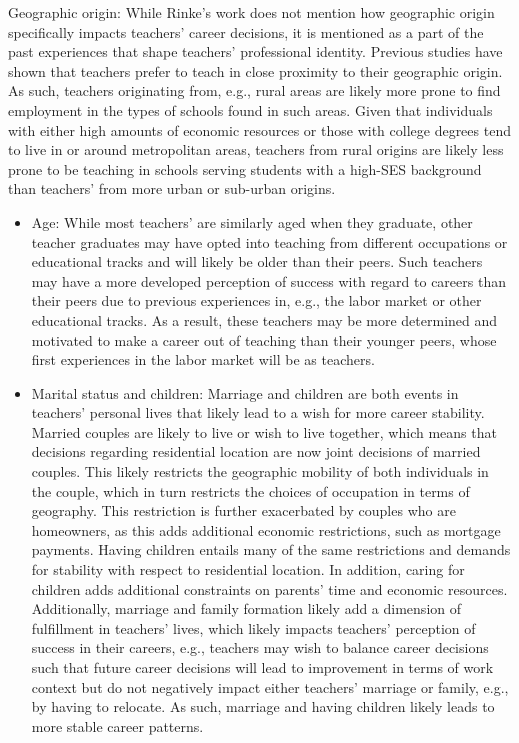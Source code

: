 \documentclass[
]{article}
\providecommand{\tightlist}{%
  \setlength{\itemsep}{0pt}\setlength{\parskip}{0pt}}
\begin{document}
\begin{itemize}
\begin{itemize}
    Geographic origin: While Rinke's work does not mention how geographic origin specifically impacts teachers' career decisions, it is mentioned as a part of the past experiences that shape teachers' professional identity. Previous studies have shown that teachers prefer to teach in close proximity to their geographic origin. As such, teachers originating from, e.g., rural areas are likely more prone to find employment in the types of schools found in such areas. Given that individuals with either high amounts of economic resources or those with college degrees tend to live in or around metropolitan areas, teachers from rural origins are likely less prone to be teaching in schools serving students with a high-SES background than teachers' from more urban or sub-urban origins.
  \end{itemize}
\end{itemize}

\begin{itemize}
\tightlist
\item
  Age: While most teachers' are similarly aged when they graduate, other teacher graduates may have opted into teaching from different occupations or educational tracks and will likely be older than their peers. Such teachers may have a more developed perception of success with regard to careers than their peers due to previous experiences in, e.g., the labor market or other educational tracks. As a result, these teachers may be more determined and motivated to make a career out of teaching than their younger peers, whose first experiences in the labor market will be as teachers.
\end{itemize}

\begin{itemize}
\tightlist
\item
  Marital status and children: Marriage and children are both events in teachers' personal lives that likely lead to a wish for more career stability. Married couples are likely to live or wish to live together, which means that decisions regarding residential location are now joint decisions of married couples. This likely restricts the geographic mobility of both individuals in the couple, which in turn restricts the choices of occupation in terms of geography. This restriction is further exacerbated by couples who are homeowners, as this adds additional economic restrictions, such as mortgage payments. Having children entails many of the same restrictions and demands for stability with respect to residential location. In addition, caring for children adds additional constraints on parents' time and economic resources. Additionally, marriage and family formation likely add a dimension of fulfillment in teachers' lives, which likely impacts teachers' perception of success in their careers, e.g., teachers may wish to balance career decisions such that future career decisions will lead to improvement in terms of work context but do not negatively impact either teachers' marriage or family, e.g., by having to relocate. As such, marriage and having children likely leads to more stable career patterns.
\end{itemize}
\end{document}
